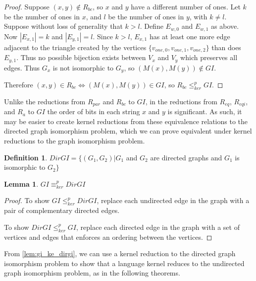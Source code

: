 \documentclass{amsart}
\newtheorem{lemma}[lemma]{Lemma}
\theoremstyle{definition} \newtheorem{definition}[definition]{Definition}
\newcommand{\kr}{\leq^{p}_{ker}} %
\newcommand{\kequiv}{\equiv^{p}_{ker}} %
\begin{document}
\begin{proof}
  Suppose $(x, y)\notin R_{bc}$, so $x$ and $y$ have a different number of
  ones. Let $k$ be the number of ones in $x$, and $l$ be the number of ones in
  $y$, with $k\neq l$. Suppose without loss of generality that $k>l$. Define
  $E_{w,0}$ and $E_{w,1}$ as above. Now $|E_{x,1}|=k$ and $|E_{y,1}|=l$. Since
  $k>l$, $E_{x,1}$ has at least one more edge adjacent to the triangle created
  by the vertices $\{v_{one,0},v_{one,1},v_{one,2}\}$ than does $E_{y,1}$. Thus
  no possible bijection exists between $V_x$ and $V_y$ which preserves all
  edges. Thus $G_x$ is not isomorphic to $G_y$, so $(M(x), M(y))\notin GI$.

  Therefore $(x, y)\in R_{bc} \iff (M(x), M(y))\in GI$, so $R_{bc}\kr GI$.
\end{proof}

Unlike the reductions from $R_{par}$ and $R_{bc}$ to $GI$, in the reductions
from $R_{eq}$, $R_{eqi}$, and $R_a$ to $GI$ the order of bits in each string
$x$ and $y$ is significant. As such, it may be easier to create kernel
reductions from these equivalence relations to the directed graph isomorphism
problem, which we can prove equivalent under kernel reductions to the graph
isomorphism problem.

\begin{definition}
  $DirGI=\{(G_1, G_2)|G_1$ and $G_2$ are directed graphs and $G_1$ is
  isomorphic to $G_2\}$
\end{definition}

\begin{lemma}\label{lem:gi_ke_dirgi}$GI\kequiv DirGI$\end{lemma}
\begin{proof}
  To show $GI\kr DirGI$, replace each undirected edge in the graph with a pair
  of complementary directed edges.
  
  To show $DirGI\kr GI$, replace each directed edge in the graph with a set of
  vertices and edges that enforces an ordering between the vertices.
\end{proof}

From \autoref{lem:gi_ke_dirgi}, we can use a kernel reduction to the directed
graph isomorphism problem to show that a language kernel reduces to the
undirected graph isomorphism problem, as in the following theorems.
\end{document}
